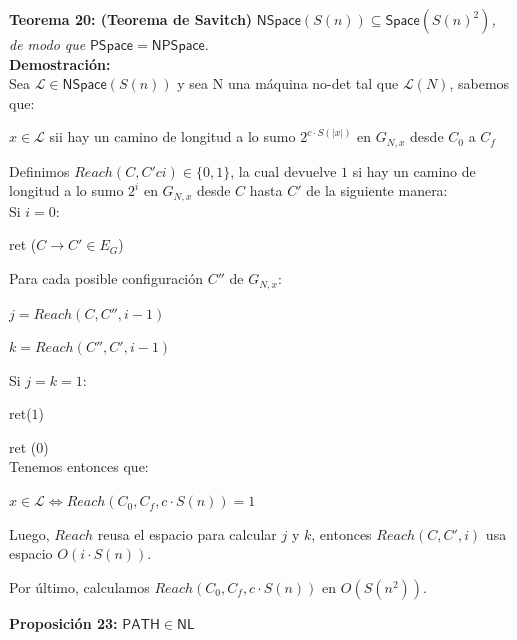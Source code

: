 \documentclass{article}
\begin{document}
\begin{flushleft}
  \textbf{Teorema 20: \hypertarget{savitch}{\textcolor{Bittersweet}{(Teorema de Savitch)}}}
  $\mathsf{NSpace}(S(n)) \subseteq \mathsf{Space}(S(n)^2)$\textit{, de modo que} $\mathsf{PSpace} = \mathsf{
  NPSpace}$. \\[0.5em]

  \textbf{\textcolor{Mulberry}{Demostración:}} \\[0.5em]

  Sea $\mathcal{L} \in \mathsf{NSpace}(S(n))$ y sea N una máquina no-det tal que $\mathcal{L}(N)$, sabemos que:
\end{flushleft}
\begin{center}
  $x \in \mathcal{L}$ sii hay un camino de longitud a lo sumo $2^{c \cdot S(|x|)}$ en $G_{N,x}$ desde $C_0$ a $C_f$
\end{center}
\begin{flushleft}
  Definimos $Reach(C, C'c i) \in \{0,1\}$, la cual devuelve $1$ si hay un camino de longitud a lo sumo $2^i$ en 
  $G_{N,x}$ desde $C$ hasta $C'$ de la siguiente manera: \\[0.5em]

  \quad Si $i = 0$:
  
  \qquad ret ($C \rightarrow C' \in E_G$)

  \quad Para cada posible configuración $C''$ de $G_{N,x}$:

  \qquad $j = Reach(C, C'', i-1)$

  \qquad $k = Reach(C'', C', i-1)$

  \qquad Si $j = k = 1$:

  \qquad \quad ret($1$)

  \quad ret ($0$)
  \\[0.5em]

  Tenemos entonces que:
\end{flushleft}
\begin{center}
  $x \in \mathcal{L} \iff Reach(C_0, C_f, c \cdot S(n)) = 1$
\end{center}
\begin{flushleft}
  Luego, $Reach$ reusa el espacio para calcular $j$ y $k$, entonces $Reach(C, C', i)$ usa espacio $O(i \cdot S(n))$.

  Por último, calculamos $Reach(C_0, C_f, c \cdot S(n))$ en $O(S(n^2))$.
\end{flushleft}


\begin{flushleft}
  \textbf{Proposición 23:}
  $\mathsf{PATH} \in \mathsf{NL}$
\end{flushleft}
\end{document}

